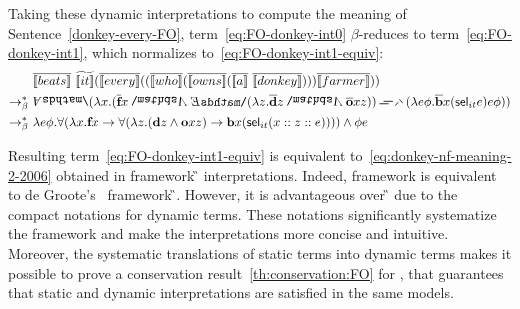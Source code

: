  Taking these dynamic interpretations to compute the meaning of Sentence~\eqref{donkey-every-FO}, term~\eqref{eq:FO-donkey-int0} $\beta$-reduces to term~\eqref{eq:FO-donkey-int1}, which normalizes to~\eqref{eq:FO-donkey-int1-equiv}:
\begin{align}
& \tr{\I{beats}}  \ \etr{\I{it}} (\tr{\I{every}}  ((\tr{\I{who}}  (\tr{\I{owns}}  (\tr{\I{a}} \ \tr{\I{donkey}} ) ) ) \tr{\I{farmer}}  ))  \label{eq:FO-donkey-int0} \\
\bred \ &  \all2 (\lambda \x1. (\tr{\textbf{f}} \x1  \cnj2     \ex2 (\lambda \z1.   \tr{\textbf{d}}   \z1  \cnj2      \tr{\textbf{o}}  \x1  \z1 ))    \imp2    (\lambda e \phi. \tr{\textbf{b}}  \x1 ( \sel_{it} e ) e \phi ) )  \label{eq:FO-donkey-int1} \\
\bred \ & \lambda e \phi. \forall (\lambda \x1. \cfarmer \x1  \rightarrow \forall  (\lambda \z1.  (\cdonkey  \z1 \land \cown  \x1 \z1 )   \rightarrow  \cbeat  \x1 ( \sel_{it}  (\upii{\x1}{\upii{\z1}{e}}) )))\land \phi e  \label{eq:FO-donkey-int1-equiv}
\end{align}

Resulting term~\eqref{eq:FO-donkey-int1-equiv} is equivalent to~\eqref{eq:donkey-nf-meaning-2-2006} obtained in framework {\G} interpretations. Indeed, framework {\GN} is equivalent to de Groote's~\cite{deGroote:2006:Towards-a-Montagovian-Account-of-Dynamics} framework {\G}. However, it is advantageous over {\G} due to the compact notations for dynamic terms. These notations significantly systematize the framework and make the interpretations more concise and intuitive. Moreover, the systematic translations of static terms into dynamic terms makes it possible to prove a conservation result~\ref{th:conservation:FO} for {\GN}, that guarantees that static and dynamic interpretations are satisfied in the same models. 





